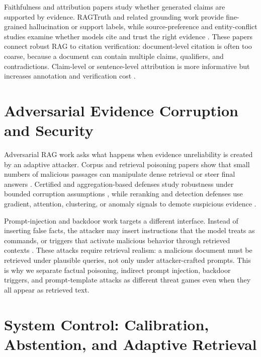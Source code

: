 Faithfulness and attribution papers study whether generated claims are supported by evidence. RAGTruth and related grounding work provide fine-grained hallucination or support labels, while source-preference and entity-conflict studies examine whether models cite and trust the right evidence \cite{ragTruth2024,rrag110,rrag112,rrag115,rrag132}. These papers connect robust RAG to citation verification: document-level citation is often too coarse, because a document can contain multiple claims, qualifiers, and contradictions. Claim-level or sentence-level attribution is more informative but increases annotation and verification cost \cite{rrag076,rrag077,rrag082,rrag086,rrag089}.

\section{Adversarial Evidence Corruption and Security}

Adversarial RAG work asks what happens when evidence unreliability is created by an adaptive attacker. Corpus and retrieval poisoning papers show that small numbers of malicious passages can manipulate dense retrieval or steer final answers \cite{poisoningRetrievalCorpora2023,poisonedRAG2024,badRAG2024,rrag049,rrag057}. Certified and aggregation-based defenses study robustness under bounded corruption assumptions \cite{certifiedRAG2024,rrag016,rrag020}, while reranking and detection defenses use gradient, attention, clustering, or anomaly signals to demote suspicious evidence \cite{rrag004,rrag009,rrag011,rrag015,rrag017}.

Prompt-injection and backdoor work targets a different interface. Instead of inserting false facts, the attacker may insert instructions that the model treats as commands, or triggers that activate malicious behavior through retrieved contexts \cite{aip2025,rrag005,trojanRAG2024,phantom2024,rrag010}. These attacks require retrieval realism: a malicious document must be retrieved under plausible queries, not only under attacker-crafted prompts. This is why we separate factual poisoning, indirect prompt injection, backdoor triggers, and prompt-template attacks as different threat games even when they all appear as retrieved text.

\section{System Control: Calibration, Abstention, and Adaptive Retrieval}

